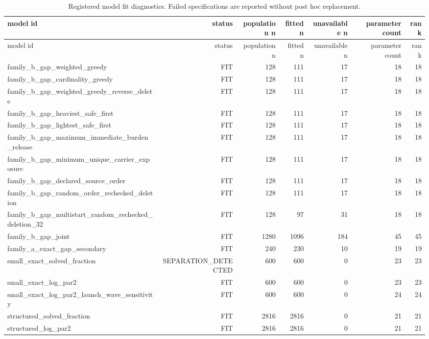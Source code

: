 {\footnotesize
\begin{longtable}{lrrrrrr}
\caption{Registered model fit diagnostics. Failed specifications are reported without post hoc replacement.}\label{tab:aor-registered-model-diagnostics}\\
\toprule
model id & status & population n & fitted n & unavailable n & parameter count & rank \\
\midrule
\endfirsthead
\toprule
model id & status & population n & fitted n & unavailable n & parameter count & rank \\
\midrule
\endhead
family\_b\_gap\_weighted\_greedy & FIT & 128 & 111 & 17 & 18 & 18 \\
family\_b\_gap\_cardinality\_greedy & FIT & 128 & 111 & 17 & 18 & 18 \\
family\_b\_gap\_weighted\_greedy\_reverse\_delete & FIT & 128 & 111 & 17 & 18 & 18 \\
family\_b\_gap\_heaviest\_safe\_first & FIT & 128 & 111 & 17 & 18 & 18 \\
family\_b\_gap\_lightest\_safe\_first & FIT & 128 & 111 & 17 & 18 & 18 \\
family\_b\_gap\_maximum\_immediate\_burden\_release & FIT & 128 & 111 & 17 & 18 & 18 \\
family\_b\_gap\_minimum\_unique\_carrier\_exposure & FIT & 128 & 111 & 17 & 18 & 18 \\
family\_b\_gap\_declared\_source\_order & FIT & 128 & 111 & 17 & 18 & 18 \\
family\_b\_gap\_random\_order\_rechecked\_deletion & FIT & 128 & 111 & 17 & 18 & 18 \\
family\_b\_gap\_multistart\_random\_rechecked\_deletion\_32 & FIT & 128 & 97 & 31 & 18 & 18 \\
family\_b\_gap\_joint & FIT & 1280 & 1096 & 184 & 45 & 45 \\
family\_a\_exact\_gap\_secondary & FIT & 240 & 230 & 10 & 19 & 19 \\
small\_exact\_solved\_fraction & SEPARATION\_DETECTED & 600 & 600 & 0 & 23 & 23 \\
small\_exact\_log\_par2 & FIT & 600 & 600 & 0 & 23 & 23 \\
small\_exact\_log\_par2\_launch\_wave\_sensitivity & FIT & 600 & 600 & 0 & 24 & 24 \\
structured\_solved\_fraction & FIT & 2816 & 2816 & 0 & 21 & 21 \\
structured\_log\_par2 & FIT & 2816 & 2816 & 0 & 21 & 21 \\

\end{longtable}}
